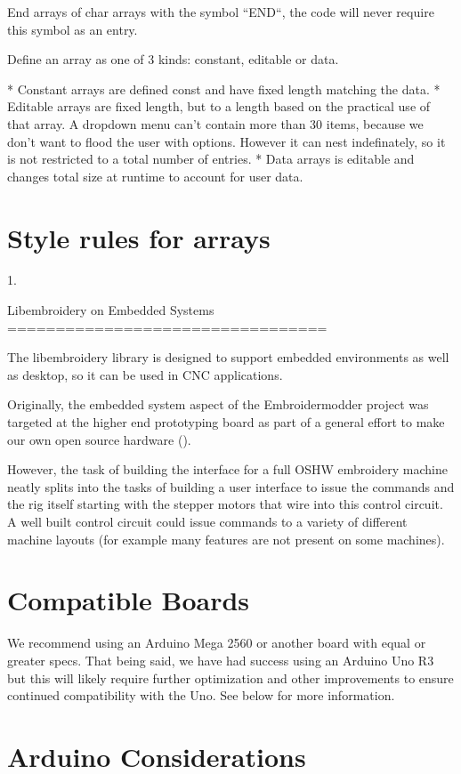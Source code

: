 \documentclass[a4paper]{report}
\begin{document}
End arrays of char arrays with the symbol ``END``, the code will never require
this symbol as an entry.

Define an array as one of 3 kinds: constant, editable or data.

* Constant arrays are defined const and have fixed length matching the data.
* Editable arrays are fixed length, but to a length based on the practical use
  of that array. A dropdown menu can't contain more than 30 items, because we
  don't want to flood the user with options. However it can nest indefinately,
  so it is not restricted to a total number of entries.
* Data arrays is editable and changes total size at runtime to account for user data.

\section{Style rules for arrays}

1.

Libembroidery on Embedded Systems
=================================

The libembroidery library is designed to support embedded environments as well
as desktop, so it can be used in CNC applications.

Originally, the embedded system aspect of the Embroidermodder project was
targeted at the higher end  prototyping board as part
of a general effort to make our own open source hardware ().

However, the task of building the interface for a full OSHW embroidery machine
neatly splits into the tasks of building a user interface to issue the
commands and the rig itself starting with the stepper motors that wire into
this control circuit. A well built control circuit could issue commands to
a variety of different machine layouts (for example many features are not
present on some machines).

\section{Compatible Boards}

We recommend using an Arduino Mega 2560 or another board with equal or
greater specs. That being said, we have had success using an Arduino Uno
R3 but this will likely require further optimization and other
improvements to ensure continued compatibility with the Uno. See below
for more information.

\section{Arduino Considerations}
\end{document}
